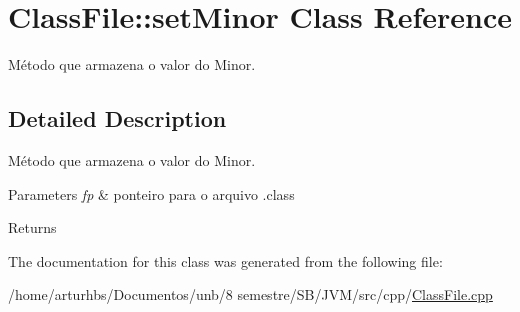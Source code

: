 \hypertarget{classClassFile_1_1setMinor}{}\section{Class\+File\+:\+:set\+Minor Class Reference}
\label{classClassFile_1_1setMinor}


Método que armazena o valor do Minor.  




\subsection{Detailed Description}
Método que armazena o valor do Minor. 


\begin{DoxyParams}{Parameters}
{\em fp} & ponteiro para o arquivo .class \\
\hline
\end{DoxyParams}
\begin{DoxyReturn}{Returns}

\end{DoxyReturn}


The documentation for this class was generated from the following file\+:\begin{DoxyCompactItemize}
\item 
/home/arturhbs/\+Documentos/unb/8 semestre/\+S\+B/\+J\+V\+M/src/cpp/\hyperlink{ClassFile_8cpp}{Class\+File.\+cpp}\end{DoxyCompactItemize}
